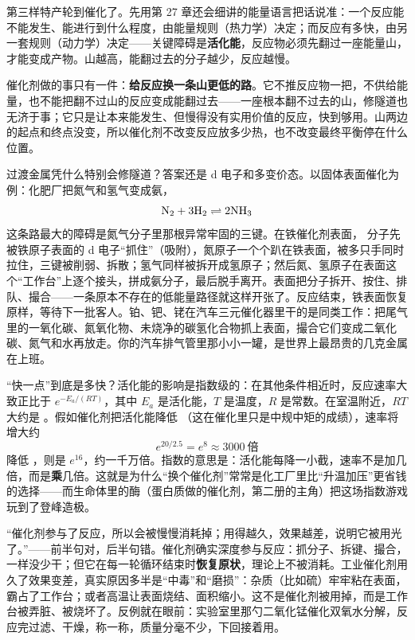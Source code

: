 第三样特产轮到催化了。先用第 27 章还会细讲的能量语言把话说准：一个反应能不能发生、能进行到什么程度，由能量规则（热力学）决定；而反应有多快，由另一套规则（动力学）决定——关键障碍是\textbf{活化能}，反应物必须先翻过一座能量山，才能变成产物。山越高，能翻过去的分子越少，反应越慢。

催化剂做的事只有一件：\textbf{给反应换一条山更低的路}。它不推反应物一把，不供给能量，也不能把翻不过山的反应变成能翻过去——一座根本翻不过去的山，修隧道也无济于事；它只是让本来能发生、但慢得没有实用价值的反应，快到够用。山两边的起点和终点没变，所以催化剂不改变反应放多少热，也不改变最终平衡停在什么位置。

过渡金属凭什么特别会修隧道？答案还是 d 电子和多变价态。以固体表面催化为例：化肥厂把氮气和氢气变成氨，
\[\mathrm{N_2} + \mathrm{3H_2} \rightleftharpoons \mathrm{2NH_3}\]
这条路最大的障碍是氮气分子里那根异常牢固的三键。在铁催化剂表面， 分子先被铁原子表面的 d 电子“抓住”（吸附），氮原子一个个趴在铁表面，被多只手同时拉住，三键被削弱、拆散；氢气同样被拆开成氢原子；然后氮、氢原子在表面这个“工作台”上逐个接头，拼成氨分子，最后脱手离开。表面把分子拆开、按住、排队、撮合——一条原本不存在的低能量路径就这样开张了。反应结束，铁表面恢复原样，等待下一批客人。铂、钯、铑在汽车三元催化器里干的是同类工作：把尾气里的一氧化碳、氮氧化物、未烧净的碳氢化合物抓上表面，撮合它们变成二氧化碳、氮气和水再放走。你的汽车排气管里那小小一罐，是世界上最昂贵的几克金属在上班。

\begin{qiaoliang}
“快一点”到底是多快？活化能的影响是指数级的：在其他条件相近时，反应速率大致正比于 $e^{-E_a/(RT)}$，其中 $E_a$ 是活化能，$T$ 是温度，$R$ 是常数。在室温附近，$RT$ 大约是 。假如催化剂把活化能降低 （这在催化里只是中规中矩的成绩），速率将增大约
\[e^{20/2.5} = e^{8} \approx 3000\ \text{倍}\]
降低 ，则是 $e^{16}$，约一千万倍。指数的意思是：活化能每降一小截，速率不是加几倍，而是\textbf{乘}几倍。这就是为什么“换个催化剂”常常是化工厂里比“升温加压”更省钱的选择——而生命体里的酶（蛋白质做的催化剂，第二册的主角）把这场指数游戏玩到了登峰造极。
\end{qiaoliang}

\begin{wuqu}
“催化剂参与了反应，所以会被慢慢消耗掉；用得越久，效果越差，说明它被用光了。”——前半句对，后半句错。催化剂确实深度参与反应：抓分子、拆键、撮合，一样没少干；但它在每一轮循环结束时\textbf{恢复原状}，理论上不被消耗。工业催化剂用久了效果变差，真实原因多半是“中毒”和“磨损”：杂质（比如硫）牢牢粘在表面，霸占了工作台；或者高温让表面烧结、面积缩小。这不是催化剂被用掉，而是工作台被弄脏、被烧坏了。反例就在眼前：实验室里那勺二氧化锰催化双氧水分解，反应完过滤、干燥，称一称，质量分毫不少，下回接着用。
\end{wuqu}

